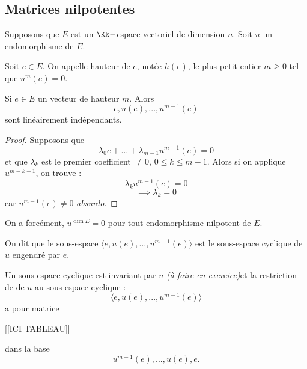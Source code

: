 \documentclass[class=report,crop=false]{standalone}
\newcommand{\exoo}{\emph{(à faire en exercice)}}
\begin{document}
\subsection{Matrices nilpotentes}

Supposons que $E$ est un $\Kk-$espace vectoriel de dimension $n$.
Soit $u$ un endomorphisme de $E$.

\begin{definition}
Soit $e \in E$. On appelle hauteur de $e$, notée $h(e)$, le plus petit entier $m \ge 0$ tel que $u^m(e)=0$.  
\end{definition}

\begin{lemme}
Si $e \in E$ un vecteur de hauteur $m$. Alors 
\[e,u(e),...,u^{m-1}(e)\]
sont linéairement indépendants.
\end{lemme}

\begin{proof}
Supposons que \[\lambda_0 e + ... + \lambda_{m-1}u^{m-1}(e) = 0\]
et que $\lambda_k$ est le premier coefficient $\neq 0$, $0 \le k \le m-1$. Alors si on applique $u^{m-k-1}$, on trouve :
\[\lambda_ku^{m-1}(e) =0\]
\[\implies \lambda_k = 0\]
car $u^{m-1}(e) \neq 0$ {\it absurdo}. 
\end{proof}

\begin{corollaire}
On a forcément, $u^{\dim E} = 0$ pour tout endomorphisme nilpotent de $E$.
\end{corollaire}

\begin{definition}
On dit que le sous-espace $\langle e,u(e),...,u^{m-1}(e)\rangle$ est le sous-espace cyclique 
 de $u$ engendré par $e$.\end{definition}


Un sous-espace cyclique est invariant par $u$ \exoo et la restriction de de $u$  au sous-espace cyclique :
\[\langle e,u(e),...,u^{m-1}(e)\rangle\]a pour matrice

[[ICI TABLEAU]]


dans la base \[u^{m-1}(e),...,u(e),e .\] 
\end{document}
